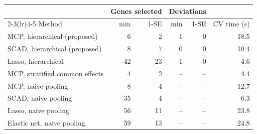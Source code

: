 \begin{tabular}{@{}lrrrrr@{}}
\toprule
& \multicolumn{2}{c}{Genes selected} & \multicolumn{2}{c}{Deviations} & \\
\cmidrule(lr){2-3}\cmidrule(lr){4-5}
Method & min & 1-SE & min & 1-SE & CV time (s) \\
\midrule
MCP, hierarchical (proposed) & 6 & 2 & 1 & 0 & 18.5 \\
SCAD, hierarchical (proposed) & 8 & 7 & 0 & 0 & 10.4 \\
Lasso, hierarchical & 42 & 23 & 1 & 0 & 4.6 \\
MCP, stratified common effects & 4 & 2 & -- & -- & 4.4 \\
MCP, naive pooling & 8 & 4 & -- & -- & 12.7 \\
SCAD, naive pooling & 35 & 4 & -- & -- & 6.3 \\
Lasso, naive pooling & 56 & 11 & -- & -- & 23.8 \\
Elastic net, naive pooling & 59 & 13 & -- & -- & 24.8 \\
\bottomrule
\end{tabular}
